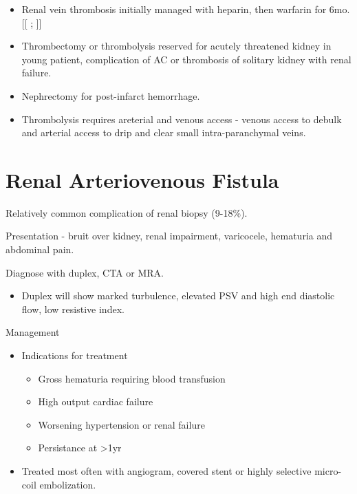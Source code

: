 \documentclass[
]{book}
\providecommand{\tightlist}{%
  \setlength{\itemsep}{0pt}\setlength{\parskip}{0pt}}
\begin{document}
\begin{itemize}
\item
  Renal vein thrombosis initially managed with heparin, then warfarin
  for 6mo. {[}{[} \citet{asgharRenalVeinThrombosis2007};
  \citet{velazquez-ramirez129RenovascularDisease2019}{]}{]}
\item
  Thrombectomy or thrombolysis reserved for acutely threatened kidney
  in young patient, complication of AC or thrombosis of solitary
  kidney with renal failure.
\item
  Nephrectomy for post-infarct hemorrhage.
\item
  Thrombolysis requires areterial and venous access - venous access to
  debulk and arterial access to drip and clear small intra-paranchymal
  veins.
\end{itemize}

\hypertarget{renal-arteriovenous-fistula}{%
\section{Renal Arteriovenous Fistula}\label{renal-arteriovenous-fistula}}

Relatively common complication of renal biopsy (9-18\%).
\citep{schwarzCourseRelevanceArteriovenous2008}

Presentation - bruit over kidney, renal impairment, varicocele,
hematuria and abdominal pain. \citep{hunter174AcquiredArteriovenous2019}

Diagnose with duplex, CTA or MRA.

\begin{itemize}
\tightlist
\item
  Duplex will show marked turbulence, elevated PSV and high end
  diastolic flow, low resistive index.
  \citep{ozbekImagedirectedColorDoppler1995}
\end{itemize}

Management

\begin{itemize}
\item
  Indications for treatment \citep{merkusHighIncidenceArteriovenous2005, morimotoUniqueCaseRenovascular1995}

  \begin{itemize}
  \item
    Gross hematuria requiring blood transfusion
  \item
    High output cardiac failure
  \item
    Worsening hypertension or renal failure
  \item
    Persistance at \textgreater1yr
  \end{itemize}
\item
  Treated most often with angiogram, covered stent or highly selective
  micro-coil embolization. \citep{ginatTranscatheterRenalArtery2009, saliouIdiopathicRenalArteriovenous1998}
\end{itemize}
\end{document}
